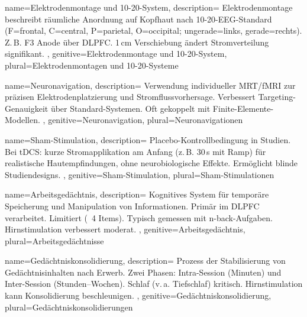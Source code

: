 {
	name=Elektrodenmontage und 10-20-System,
	description={
			Elektrodenmontage beschreibt räumliche Anordnung auf Kopfhaut nach 10-20-EEG-Standard (F=frontal, C=central, P=parietal, O=occipital; ungerade=links, gerade=rechts). Z.\,B. F3 Anode über DLPFC. 1\,cm Verschiebung ändert Stromverteilung signifikant. \cite{woods_technical_2016, caulfield_optimized_2022}
		},
	genitive=Elektrodenmontage und 10-20-System,
	plural=Elektrodenmontagen und 10-20-Systeme
}

{
	name=Neuronavigation,
	description={
			Verwendung individueller MRT/fMRI zur präzisen Elektrodenplatzierung und Stromflussvorhersage. Verbessert Targeting-Genauigkeit über Standard-Systemen. Oft gekoppelt mit Finite-Elemente-Modellen. \cite{woods_technical_2016, meinzer_investigating_2024}
		},
	genitive=Neuronavigation,
	plural=Neuronavigationen
}

{
	name=Sham-Stimulation,
	description={
			Placebo-Kontrollbedingung in Studien. Bei \gls{tDCS}: kurze Stromapplikation am Anfang (z.\,B. 30\,s mit Ramp) für realistische Hautempfindungen, ohne neurobiologische Effekte. Ermöglicht blinde Studiendesigns. \cite{woods_technical_2016}
		},
	genitive=Sham-Stimulation,
	plural=Sham-Stimulationen
}


{
	name=Arbeitsgedächtnis,
	description={
			Kognitives System für temporäre Speicherung und Manipulation von Informationen. Primär im \gls{DLPFC} verarbeitet. Limitiert (~4 Items). Typisch gemessen mit n-back-Aufgaben. Hirnstimulation verbessert moderat. \cite{hoy_enhancement_2016, senkowski_boosting_2022}
		},
	genitive=Arbeitsgedächtnis,
	plural=Arbeitsgedächtnisse
}

{
	name=Gedächtniskonsolidierung,
	description={
			Prozess der Stabilisierung von Gedächtnisinhalten nach Erwerb. Zwei Phasen: Intra-Session (Minuten) und Inter-Session (Stunden--Wochen). Schlaf (v.\,a. Tiefschlaf) kritisch. Hirnstimulation kann Konsolidierung beschleunigen. \cite{reis_noninvasive_2009}
		},
	genitive=Gedächtniskonsolidierung,
	plural=Gedächtniskonsolidierungen
}

